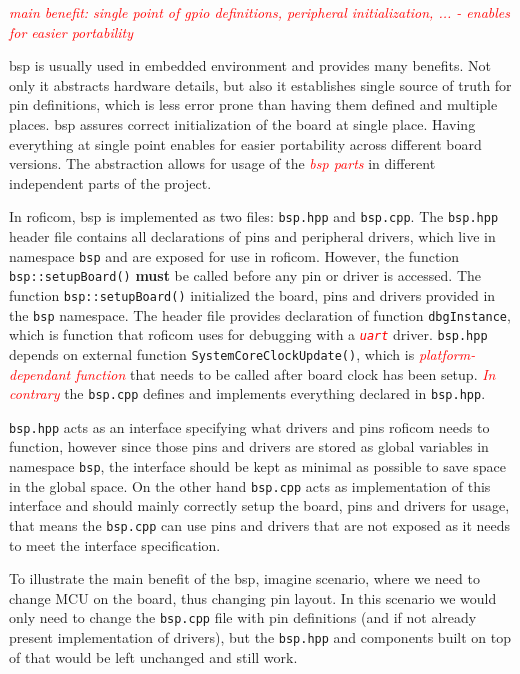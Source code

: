 \documentclass[
  digital,     %
  oneside,     %
  nosansbold,  %
  nocolorbold, %
  lof,         %
  lot,         %
]{fithesis4}
\newcommand{\TODO}[1]{\textcolor{red}{\textit{#1}}}
\begin{document}
\TODO{main benefit: single point of gpio definitions, peripheral initialization, ... - enables for easier portability}

\acrshort{bsp} is usually used in embedded environment and provides many benefits. Not only it abstracts hardware details, but also it establishes single source of truth for pin definitions, which is less error prone than having them defined and multiple places. \acrshort{bsp} assures correct initialization of the board at single place. Having everything at single point enables for easier portability across different board versions. The abstraction allows for usage of the \TODO{bsp parts} in different independent parts of the project. 

In \acrshort{roficom}, \acrshort{bsp} is implemented as two files: \verb|bsp.hpp| and \verb|bsp.cpp|. The \verb|bsp.hpp| header file contains all declarations of pins and peripheral drivers, which live in namespace \lstinline{bsp} and are exposed for use in \acrshort{roficom}. However, the function \lstinline{bsp::setupBoard()} \textbf{must} be called before any pin or driver is accessed. The function \lstinline{bsp::setupBoard()} initialized the board, pins and drivers provided in the \lstinline{bsp} namespace. The header file provides declaration of function \lstinline{dbgInstance}, which is function that \acrshort{roficom} uses for debugging with a \TODO{ \texttt{uart} } driver. \verb|bsp.hpp| depends on external function \lstinline|SystemCoreClockUpdate()|, which is \TODO{platform-dependant function} that needs to be called after board clock has been setup. \TODO{In contrary} the \verb|bsp.cpp| defines and implements everything declared in \verb|bsp.hpp|. 

\verb|bsp.hpp| acts as an interface specifying what drivers and pins \acrshort{roficom} needs to function, however since those pins and drivers are stored as global variables in namespace \lstinline{bsp}, the interface should be kept as minimal as possible to save space in the global space. On the other hand \verb|bsp.cpp| acts as implementation of this interface and should mainly correctly setup the board, pins and drivers for usage, that means the \verb|bsp.cpp| can use pins and drivers that are not exposed as it needs to meet the interface specification.

To illustrate the main benefit of the \acrshort{bsp}, imagine scenario, where we need to change MCU on the board, thus changing pin layout. In this scenario we would only need to change the \verb|bsp.cpp| file with pin definitions (and if not already present implementation of drivers), but the \verb|bsp.hpp| and components built on top of that would be left unchanged and still work.
\end{document}
